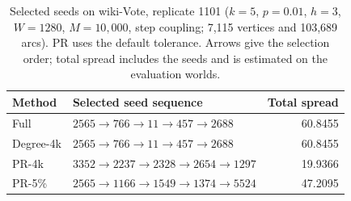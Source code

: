 \begin{table}[htbp]
\caption{Selected seeds on wiki-Vote, replicate 1101 ($k=5$, $p=0.01$, $h=3$, $W=1280$, $M=10{,}000$, step coupling; 7,115 vertices and 103,689 arcs). PR uses the default tolerance. Arrows give the selection order; total spread includes the seeds and is estimated on the evaluation worlds.}\label{tab:case}
\begin{tabularx}{\linewidth}{lXr}\toprule
Method & Selected seed sequence & Total spread \\ \midrule
Full & $2565\to 766\to 11\to 457\to 2688$ & 60.8455 \\
Degree-4k & $2565\to 766\to 11\to 457\to 2688$ & 60.8455 \\
PR-4k & $3352\to 2237\to 2328\to 2654\to 1297$ & 19.9366 \\
PR-5\% & $2565\to 1166\to 1549\to 1374\to 5524$ & 47.2095 \\
\bottomrule\end{tabularx}
\end{table}
